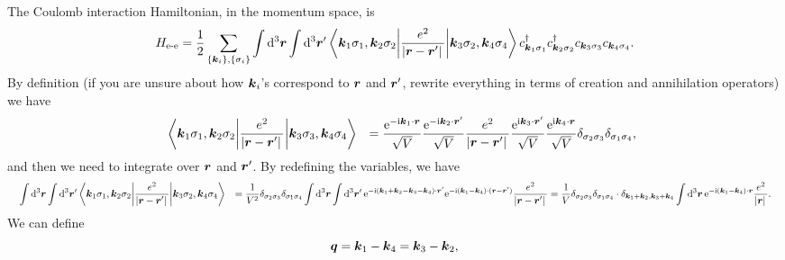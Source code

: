 \documentclass[hyperref, a4paper]{report}
\newcommand*{\ii}{\mathrm{i}}
\newcommand*{\ee}{\mathrm{e}}
\def\\{}%
\begin{document}
The Coulomb interaction Hamiltonian, 
in the momentum space, is 
\begin{equation}
    H_{\text{e-e}} = \frac{1}{2} \sum_{\{\vb*{k}_i\}, \{\sigma_i\}} \int \dd[3]{\vb*{r}} \int \dd[3]{\vb*{r}'}
    \mel**{\vb*{k}_1 \sigma_1, \vb*{k}_2 \sigma_2}%
    {\frac{e^2}{\abs*{\vb*{r} - \vb*{r}'}}}%
    {\vb*{k}_3 \sigma_2, \vb*{k}_4 \sigma_4}
    c^\dagger_{\vb*{k}_1 \sigma_1} c^\dagger_{\vb*{k}_2 \sigma_2}
    c_{\vb*{k}_3 \sigma_3} c_{\vb*{k}_4 \sigma_4}.
\end{equation}
By definition (if you are unsure about how $\vb*{k}_i$'s correspond to $\vb*{r}$ and $\vb*{r}'$,
rewrite everything in terms of creation and annihilation operators)
we have 
\[
\begin{aligned}
    &\quad \mel**{\vb*{k}_1 \sigma_1, \vb*{k}_2 \sigma_2}%
    {\frac{e^2}{\abs*{\vb*{r} - \vb*{r}'}}}%
    {\vb*{k}_3 \sigma_3, \vb*{k}_4 \sigma_4} \\
    &= \frac{\ee^{- \ii \vb*{k}_1 \cdot \vb*{r}}}{\sqrt{V}}
    \frac{\ee^{- \ii \vb*{k}_2 \cdot \vb*{r}'}}{\sqrt{V}}
    \frac{e^2}{\abs*{\vb*{r} - \vb*{r}'}}
    \frac{\ee^{\ii \vb*{k}_3 \cdot \vb*{r}'}}{\sqrt{V}}
    \frac{\ee^{\ii \vb*{k}_4 \cdot \vb*{r}}}{\sqrt{V}} 
    \delta_{\sigma_2 \sigma_3} \delta_{\sigma_1 \sigma_4},
\end{aligned}
\]
and then we need to integrate over $\vb*{r}$ and $\vb*{r}'$.
By redefining the variables, 
we have 
\[
    \begin{aligned}
        &\quad \int \dd[3]{\vb*{r}} \int \dd[3]{\vb*{r}'}
        \mel**{\vb*{k}_1 \sigma_1, \vb*{k}_2 \sigma_2}%
         {\frac{e^2}{\abs*{\vb*{r} - \vb*{r}'}}}%
        {\vb*{k}_3 \sigma_2, \vb*{k}_4 \sigma_4} \\
        &= \frac{1}{V^2} \delta_{\sigma_2 \sigma_3} \delta_{\sigma_1 \sigma_4}
        \int \dd[3]{\vb*{r}} \int \dd[3]{\vb*{r}'}
        \ee^{- \ii (\vb*{k}_1 + \vb*{k}_2 - \vb*{k}_3 - \vb*{k}_4) \cdot \vb*{r}'}
        \ee^{- \ii (\vb*{k}_1 - \vb*{k}_4) \cdot (\vb*{r} - \vb*{r}')}
        \frac{e^2}{\abs*{\vb*{r} - \vb*{r}'}} \\
        &= \frac{1}{V} \delta_{\sigma_2 \sigma_3} \delta_{\sigma_1 \sigma_4}
        \cdot \delta_{\vb*{k}_1 + \vb*{k}_2, \vb*{k}_3 + \vb*{k}_4}
        \int \dd[3]{\vb*{r}} \ee^{- \ii (\vb*{k}_1 - \vb*{k}_4) \cdot \vb*{r}} \frac{e^2}{\abs*{\vb*{r}}} .
    \end{aligned}
\]
We can define 
\begin{equation}
    \vb*{q} = \vb*{k}_1 - \vb*{k}_4 = \vb*{k}_3 - \vb*{k}_2,
\end{equation}
\end{document}
